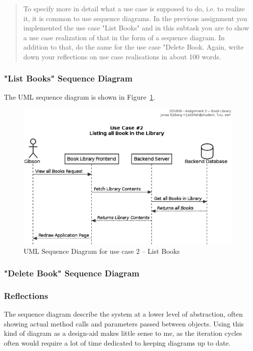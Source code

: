 \begin{quote}
  To specify more in detail what a use case is supposed to do, i.e. to realize
  it, it is common to use sequence diagrams. In the previous assignment you
  implemented the use case "List Books" and in this subtask you are to show a
  use case realization of that in the form of a sequence diagram. In addition
  to that, do the same for the use case "Delete Book.  Again, write down your
  reflections on use case realisations in about 100 words.
\end{quote}


\subsubsection{"List Books" Sequence Diagram}\label{task-1a-usecase2seq}
The UML sequence diagram is shown in Figure~\ref{fig:uml-usecase2seq}.

\begin{figure}[htbp]
  \centering
  \includegraphics[width=\linewidth]{include/uml-use-case-2-seq.eps}
  \caption{UML Sequence Diagram for use case 2 -- List Books}
  \label{fig:uml-usecase2seq}
\end{figure}


\subsubsection{"Delete Book" Sequence Diagram}\label{task-1c-sequence2}
%


\subsubsection{Reflections}\label{task-1c-reflect}
The sequence diagram describe the system at a lower level of abstraction, often
showing actual method calls and parameters passed between objects. Using this
kind of diagram as a design-aid makes little sense to me, as the iteration
cycles often would require a lot of time dedicated to keeping diagrams up to
date.

